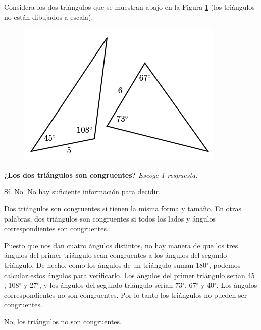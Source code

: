 \question[5] Considera los dos triángulos que se muestran abajo en la Figura \ref{fig:20230323153510} (los triángulos no están dibujados a escala).

\begin{figure}[H]
    \includegraphics[width=0.5\linewidth]{../images/20230323153510}
    \caption{}
    \label{fig:20230323153510}
\end{figure}

\textbf{¿Los dos triángulos son congruentes?}
\emph{Escoge 1 respuesta:}

\begin{choices}
    \choice Sí.
    \CorrectChoice No.
    \choice No hay suficiente información para decidir.
\end{choices}

\begin{solutionbox}{5cm}
    Dos triángulos son congruentes si tienen la misma forma y tamaño. En otras palabras, dos triángulos son congruentes si todos los lados y ángulos correspondientes son congruentes.

    Puesto que nos dan cuatro ángulos distintos, no hay manera de que los tres ángulos del primer triángulo sean congruentes a los ángulos del segundo triángulo.
    De hecho, como los ángulos de un triángulo suman 180$^\circ$, podemos calcular estos ángulos para verificarlo. Los ángulos del primer triángulo serían 45$^\circ$, 108$^\circ$ y 27$^\circ$, y los ángulos del segundo triángulo serían 73$^\circ$, 67$^\circ$ y 40$^\circ$.
    Los ángulos correspondientes no son congruentes. Por lo tanto los triángulos no pueden ser congruentes.

    No, los triángulos no son congruentes.
\end{solutionbox}